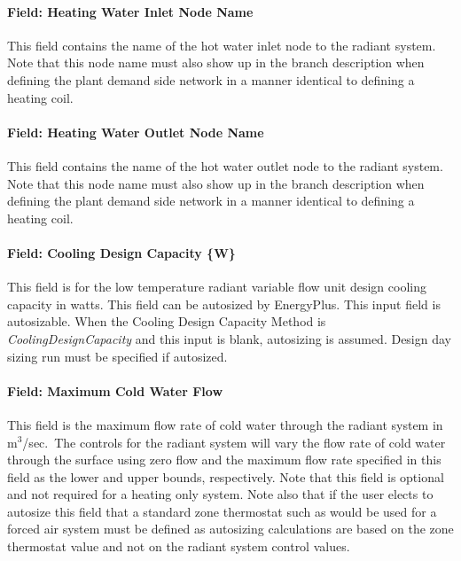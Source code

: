 \paragraph{Field: Heating Water Inlet Node Name}\label{field-heating-water-inlet-node-name}

This field contains the name of the hot water inlet node to the radiant system. Note that this node name must also show up in the branch description when defining the plant demand side network in a manner identical to defining a heating coil.

\paragraph{Field: Heating Water Outlet Node Name}\label{field-heating-water-outlet-node-name}

This field contains the name of the hot water outlet node to the radiant system. Note that this node name must also show up in the branch description when defining the plant demand side network in a manner identical to defining a heating coil.

\paragraph{Field: Cooling Design Capacity \{W\}}\label{field-cooling-design-capacity-w-000}

This field is for the low temperature radiant variable flow unit design cooling capacity in watts. This field can be autosized by EnergyPlus. This input field is autosizable. When the Cooling Design Capacity Method is \emph{CoolingDesignCapacity} and this input is blank, autosizing is assumed. Design day sizing run must be specified if autosized.

\paragraph{Field: Maximum Cold Water Flow}\label{field-maximum-cold-water-flow}

This field is the maximum flow rate of cold water through the radiant system in m\(^{3}\)/sec.~The controls for the radiant system will vary the flow rate of cold water through the surface using zero flow and the maximum flow rate specified in this field as the lower and upper bounds, respectively. Note that this field is optional and not required for a heating only system. Note also that if the user elects to autosize this field that a standard zone thermostat such as would be used for a forced air system must be defined as autosizing calculations are based on the zone thermostat value and not on the radiant system control values.

